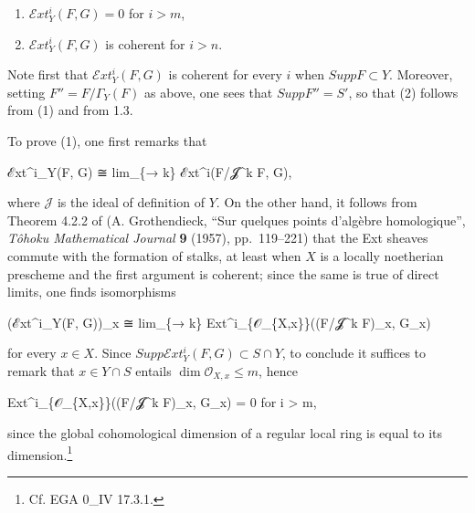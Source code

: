 \documentclass[
]{article}
\newenvironment{Shaded}{}{}
\newcommand{\NormalTok}[1]{#1}
\providecommand{\tightlist}{%
  \setlength{\itemsep}{0pt}\setlength{\parskip}{0pt}}
\begin{document}
\begin{enumerate}
\def\labelenumi{\arabic{enumi}.}
\tightlist
\item
  \(\mathcal{E}xt^{i}_{Y}(F, G) = 0\) for \(i > m\),
\item
  \(\mathcal{E}xt^{i}_{Y}(F, G)\) is coherent for \(i > n\).
\end{enumerate}

Note first that \(\mathcal{E}xt^{i}_{Y}(F, G)\) is coherent for every
\(i\) when \(Supp F \subset Y\). Moreover, setting
\(F'' = F/\Gamma_{Y}(F)\) as above, one sees that \(Supp F'' = S'\), so
that (2) follows from (1) and from 1.3.

To prove (1), one first remarks that

\begin{Shaded}
\begin{Highlighting}[]
\NormalTok{ℰxt\^{}i\_Y(F, G) ≅ lim\_\{→ k\} ℰxt\^{}i(F/𝓙\^{}k F, G),}
\end{Highlighting}
\end{Shaded}

where \(\mathcal{J}\) is the ideal of definition of \(Y\). On the other
hand, it follows from Theorem 4.2.2 of (A. Grothendieck, ``Sur quelques
points d'algèbre homologique'', \emph{Tôhoku Mathematical Journal}
\textbf{9} (1957), pp.~119--221) that the Ext sheaves commute with the
formation of stalks, at least when \(X\) is a locally noetherian
prescheme and the first argument is coherent; since the same is true of
direct limits, one finds isomorphisms

\begin{Shaded}
\begin{Highlighting}[]
\NormalTok{(ℰxt\^{}i\_Y(F, G))\_x ≅ lim\_\{→ k\} Ext\^{}i\_\{𝒪\_\{X,x\}\}((F/𝓙\^{}k F)\_x, G\_x)}
\end{Highlighting}
\end{Shaded}

for every \(x \in X\). Since
\(Supp \mathcal{E}xt^{i}_{Y}(F, G) \subset S \cap Y\), to conclude it
suffices to remark that \(x \in Y \cap S\) entails
\(\dim \mathcal{O}_{X,x} \leqslant m\), hence

\begin{Shaded}
\begin{Highlighting}[]
\NormalTok{Ext\^{}i\_\{𝒪\_\{X,x\}\}((F/𝓙\^{}k F)\_x, G\_x) = 0 for i \textgreater{} m,}
\end{Highlighting}
\end{Shaded}

since the global cohomological dimension of a regular local ring is
equal to its dimension.\footnote{Cf. EGA 0\_IV 17.3.1.}
\end{document}
